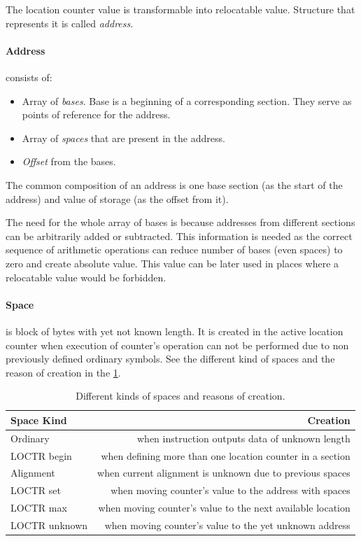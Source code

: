 The location counter value is transformable into relocatable value. Structure that represents it is called \emph{address}.

\paragraph*{Address} consists of:
\begin{itemize}
	\item Array of \emph{bases}. Base is a beginning of a corresponding section. They serve as points of reference for the address.
	\item Array of \emph{spaces} that are present in the address. 
	\item \emph{Offset} from the bases.
\end{itemize}

The common composition of an address is one base section (as the start of the address) and value of storage (as the offset from it).

The need for the whole array of bases is because addresses from different sections can be arbitrarily added or subtracted. This information is needed as the correct sequence of arithmetic operations can reduce number of bases (even spaces) to zero and create absolute value. This value can be later used in places where a relocatable value would be forbidden.

\paragraph*{Space} is block of bytes with yet not known length. It is created in the active location counter when execution of counter's operation can not be performed due to non previously defined ordinary symbols. See the different kind of spaces and the reason of creation in  the \cref{tab06:space}.

\begin{table}
	\centering
	\begin{tabular}{lr}
		\textbf{Space Kind} &                                          \textbf{Creation} \\ \toprule
		Ordinary            &            when instruction outputs data of unknown length \\
		LOCTR begin         &  when defining more than one location counter in a section \\
		Alignment           &   when current alignment is unknown due to previous spaces \\
		LOCTR set           &     when moving counter's value to the address with spaces \\
		LOCTR max           & when moving counter's value to the next available location \\
		LOCTR unknown       &     when moving counter's value to the yet unknown address \\ \bottomrule
	\end{tabular}
	\caption{Different kinds of spaces and reasons of creation.}
	\label{tab06:space}
\end{table}


